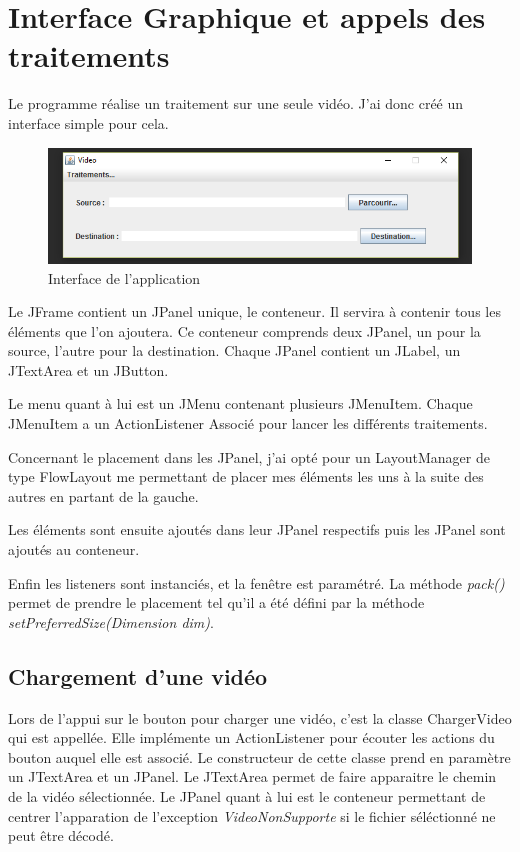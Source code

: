 \documentclass[10pt,a4paper]{article}
\begin{document}
\section{Interface Graphique et appels des traitements}

Le programme réalise un traitement sur une seule vidéo. J'ai donc créé un interface simple pour cela.

\begin{figure}[!h]
\center
\includegraphics[scale = 0.8]{interface.PNG}
\caption{Interface de l'application}
\end{figure}

Le JFrame contient un JPanel unique, le conteneur. Il servira à contenir tous les éléments que l'on ajoutera. Ce conteneur comprends deux JPanel, un pour la source, l'autre pour la destination.
Chaque JPanel contient un JLabel, un JTextArea et un JButton.



Le menu quant à lui est un JMenu contenant plusieurs JMenuItem. Chaque JMenuItem a un ActionListener Associé pour lancer les différents traitements.



Concernant le placement dans les JPanel, j'ai opté pour un LayoutManager de type FlowLayout me permettant de placer mes éléments les uns à la suite des autres en partant de la gauche.



Les éléments sont ensuite ajoutés dans leur JPanel respectifs puis les JPanel sont ajoutés au conteneur.



Enfin les listeners sont instanciés, et la fenêtre est paramétré. La méthode \textit{pack()} permet de prendre le placement tel qu'il a été défini par la méthode \textit{setPreferredSize(Dimension dim)}.

\subsection{Chargement d'une vidéo}

Lors de l'appui sur le bouton pour charger une vidéo, c'est la classe ChargerVideo qui est appellée. Elle implémente un ActionListener pour écouter les actions du bouton auquel elle est associé.
Le constructeur de cette classe prend en paramètre un JTextArea et un JPanel. Le JTextArea permet de faire apparaitre le chemin de la vidéo sélectionnée. Le JPanel quant à lui est le conteneur permettant
de centrer l'apparation de l'exception \textit{VideoNonSupporte} si le fichier séléctionné ne peut être décodé.
\end{document}
